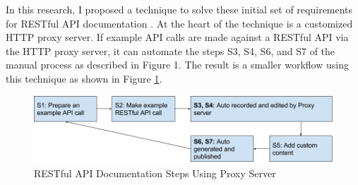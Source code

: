 \documentclass[11pt,oneside]{book}
\begin{document}
In this research, I proposed a technique to solve these initial set of requirements for RESTful API documentation \cite{sohan2015spyrest}. At the heart of the technique is a customized HTTP proxy server. If example API calls are made against a RESTful API via the HTTP proxy server, it can automate the steps S3, S4, S6, and S7 of the manual process as described in Figure 1. The result is a smaller workflow using this technique as shown in Figure \ref{fig:proxy_workflow}.

\begin{figure}[bth]
  \includegraphics[width=\linewidth]{proxy_workflow.png}
  \caption{RESTful API Documentation Steps Using Proxy Server}
  \label{fig:proxy_workflow}
\end{figure}
\end{document}

